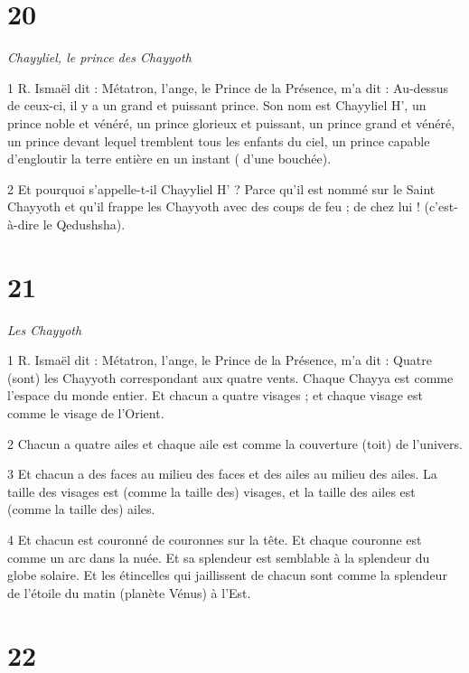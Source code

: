\chapter{20}

\par \textit{Chayyliel, le prince des Chayyoth}

\par 1 R. Ismaël dit : Métatron, l'ange, le Prince de la Présence, m'a dit : Au-dessus de ceux-ci, il y a un grand et puissant prince. Son nom est Chayyliel H', un prince noble et vénéré, un prince glorieux et puissant, un prince grand et vénéré, un prince devant lequel tremblent tous les enfants du ciel, un prince capable d'engloutir la terre entière en un instant ( d'une bouchée).

\par 2 Et pourquoi s'appelle-t-il Chayyliel H' ? Parce qu'il est nommé sur le Saint Chayyoth et qu'il frappe les Chayyoth avec des coups de feu ; de chez lui ! (c'est-à-dire le Qedushsha).

\chapter{21}

\par \textit{Les Chayyoth}

\par 1 R. Ismaël dit : Métatron, l'ange, le Prince de la Présence, m'a dit : Quatre (sont) les Chayyoth correspondant aux quatre vents. Chaque Chayya est comme l’espace du monde entier. Et chacun a quatre visages ; et chaque visage est comme le visage de l'Orient.

\par 2 Chacun a quatre ailes et chaque aile est comme la couverture (toit) de l'univers.

\par 3 Et chacun a des faces au milieu des faces et des ailes au milieu des ailes. La taille des visages est (comme la taille des) visages, et la taille des ailes est (comme la taille des) ailes.

\par 4 Et chacun est couronné de couronnes sur la tête. Et chaque couronne est comme un arc dans la nuée. Et sa splendeur est semblable à la splendeur du globe solaire. Et les étincelles qui jaillissent de chacun sont comme la splendeur de l’étoile du matin (planète Vénus) à l’Est.

\chapter{22}

